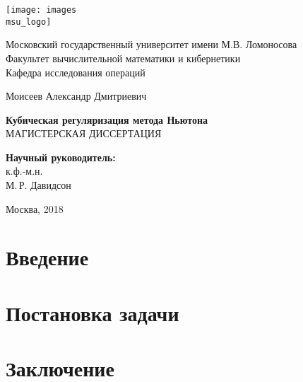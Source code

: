 \documentclass[12pt, a4paper]{article}
\begin{document}
\begin{titlepage}
\begin{center}
\texttt{[image: images\\msu\_logo]}
\end{center}
\begin{center}
Московский государственный университет имени М.В. Ломоносова\\
\vspace{0.1 cm}
Факультет вычислительной математики и кибернетики\\
\vspace{0.1 cm}
Кафедра исследования операций

\vspace{3cm}
{\Large Моисеев Александр Дмитриевич }\\
\vspace{1cm}

{\bf\LARGE Кубическая регуляризация метода Ньютона}\\ \vspace{2cm}
МАГИСТЕРСКАЯ ДИССЕРТАЦИЯ

\end{center}
\vspace{2cm}
\begin{flushright}

{\bf Научный руководитель:}\\
к.ф.-м.н.\\
М.\,Р. Давидсон

\end{flushright}

 \vspace{4.5cm}

\centerline {Москва, 2018}

\end{titlepage}
\section{Введение}

\section{Постановка задачи}

\section{Заключение}
\end{document}
